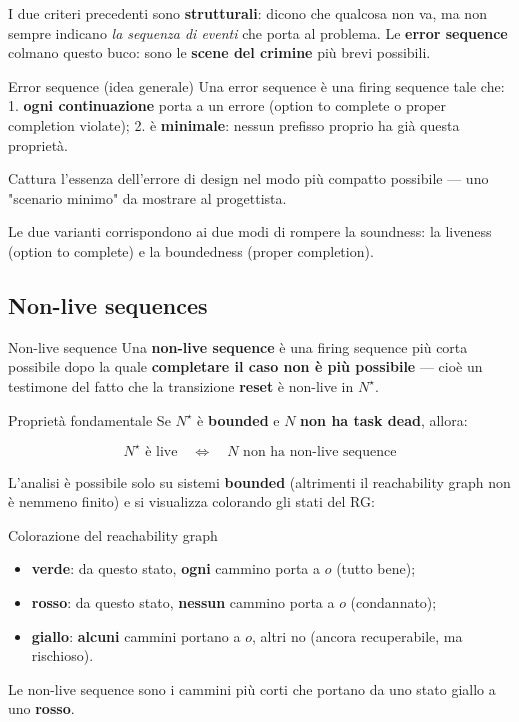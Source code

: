 I due criteri precedenti sono \textbf{strutturali}: dicono che qualcosa non va, ma non sempre indicano \emph{la sequenza di eventi} che porta al problema. Le \textbf{error sequence} colmano questo buco: sono le \textbf{scene del crimine} più brevi possibili.

\begin{boxdefinition}{Error sequence (idea generale)}
Una error sequence è una firing sequence tale che: 1. \textbf{ogni continuazione} porta a un errore (option to complete o proper completion violate); 2. è \textbf{minimale}: nessun prefisso proprio ha già questa proprietà.

Cattura l'essenza dell'errore di design nel modo più compatto possibile — uno "scenario minimo" da mostrare al progettista.
\end{boxdefinition}

Le due varianti corrispondono ai due modi di rompere la soundness: la liveness (option to complete) e la boundedness (proper completion).

\subsection{\texorpdfstring{Non-live sequences}{Non-live sequences}}

\begin{boxdefinition}{Non-live sequence}
Una \textbf{non-live sequence} è una firing sequence più corta possibile dopo la quale \textbf{completare il caso non è più possibile} — cioè un testimone del fatto che la transizione \textbf{reset} è non-live in $N^\star$.
\end{boxdefinition}

\begin{boxtheorem}{Proprietà fondamentale}
Se $N^\star$ è \textbf{bounded} e $N$ \textbf{non ha task dead}, allora:

\[
N^\star \text{ è live} \quad\iff\quad N \text{ non ha non-live sequence}
\]
\end{boxtheorem}

L'analisi è possibile solo su sistemi \textbf{bounded} (altrimenti il reachability graph non è nemmeno finito) e si visualizza colorando gli stati del RG:

\begin{boxnote}{Colorazione del reachability graph}
\begin{itemize}
\item \textbf{verde}: da questo stato, \textbf{ogni} cammino porta a $o$ (tutto bene);
\item \textbf{rosso}: da questo stato, \textbf{nessun} cammino porta a $o$ (condannato);
\item \textbf{giallo}: \textbf{alcuni} cammini portano a $o$, altri no (ancora recuperabile, ma rischioso).
\end{itemize}

Le non-live sequence sono i cammini più corti che portano da uno stato giallo a uno \textbf{rosso}.
\end{boxnote}

